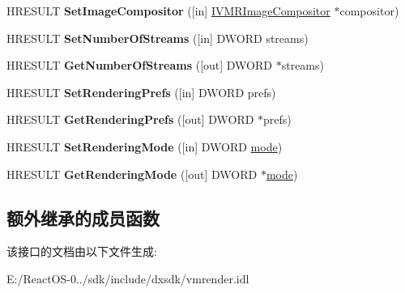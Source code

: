 \begin{DoxyCompactItemize}
H\+R\+E\+S\+U\+LT {\bfseries Set\+Image\+Compositor} (\mbox{[}in\mbox{]} \hyperlink{interface_i_v_m_r_image_compositor}{I\+V\+M\+R\+Image\+Compositor} $\ast$compositor)
\item 
\mbox{\label{interface_i_v_m_r_filter_config_a239534fefbd1d4d340d6f950ffbdf580}} 
H\+R\+E\+S\+U\+LT {\bfseries Set\+Number\+Of\+Streams} (\mbox{[}in\mbox{]} D\+W\+O\+RD streams)
\item 
\mbox{\label{interface_i_v_m_r_filter_config_a3e08d4b0f10373f237d5b58935243cdd}} 
H\+R\+E\+S\+U\+LT {\bfseries Get\+Number\+Of\+Streams} (\mbox{[}out\mbox{]} D\+W\+O\+RD $\ast$streams)
\item 
\mbox{\label{interface_i_v_m_r_filter_config_a29b6a31b1f91f0392c2fb3aed54d40e0}} 
H\+R\+E\+S\+U\+LT {\bfseries Set\+Rendering\+Prefs} (\mbox{[}in\mbox{]} D\+W\+O\+RD prefs)
\item 
\mbox{\label{interface_i_v_m_r_filter_config_af6428cd53374cf7d578b35e23ca39215}} 
H\+R\+E\+S\+U\+LT {\bfseries Get\+Rendering\+Prefs} (\mbox{[}out\mbox{]} D\+W\+O\+RD $\ast$prefs)
\item 
\mbox{\label{interface_i_v_m_r_filter_config_a88a49f92d6b143991b5cfa82634c8972}} 
H\+R\+E\+S\+U\+LT {\bfseries Set\+Rendering\+Mode} (\mbox{[}in\mbox{]} D\+W\+O\+RD \hyperlink{interfacevoid}{mode})
\item 
\mbox{\label{interface_i_v_m_r_filter_config_abb722cd549fd0a11659a533abf89a153}} 
H\+R\+E\+S\+U\+LT {\bfseries Get\+Rendering\+Mode} (\mbox{[}out\mbox{]} D\+W\+O\+RD $\ast$\hyperlink{interfacevoid}{mode})
\end{DoxyCompactItemize}
\subsection*{额外继承的成员函数}


该接口的文档由以下文件生成\+:\begin{DoxyCompactItemize}
\item 
E\+:/\+React\+O\+S-\/0../sdk/include/dxsdk/vmrender.\+idl\end{DoxyCompactItemize}
